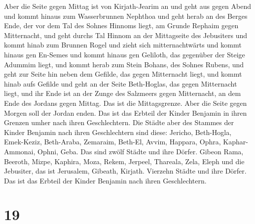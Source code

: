 Aber die Seite gegen Mittag ist von Kirjath-Jearim an und geht aus gegen
Abend und kommt hinaus zum Wasserbrunnen Nephthoa  und geht
herab an des Berges Ende, der vor dem Tal des Sohnes Hinnoms liegt, am
Grunde Rephaim gegen Mitternacht, und geht durchs Tal Hinnom an der
Mittagseite des Jebusiters und kommt hinab zum Brunnen Rogel
 und zieht sich mitternachtwärts und kommt hinaus gen
En-Semes und kommt hinaus gen Geliloth, das gegenüber der Steige Adummim
liegt, und kommt herab zum Stein Bohans, des Sohnes Rubens,
 und geht zur Seite hin neben dem Gefilde, das gegen
Mitternacht liegt, und kommt hinab aufs Gefilde  und geht
an der Seite Beth-Hoglas, das gegen Mitternacht liegt, und ihr Ende ist
an der Zunge des Salzmeers gegen Mitternacht, an dem Ende des Jordans
gegen Mittag. Das ist die Mittagsgrenze.  Aber die Seite
gegen Morgen soll der Jordan enden. Das ist das Erbteil der Kinder
Benjamin in ihren Grenzen umher nach ihren Geschlechtern. 
Die Städte aber des Stammes der Kinder Benjamin nach ihren Geschlechtern
sind diese: Jericho, Beth-Hogla, Emek-Keziz,  Beth-Araba,
Zemaraim, Beth-El,  Avvim, Happara, Ophra, 
Kaphar-Ammonai, Ophni, Geba. Das sind zwölf Städte und ihre Dörfer.
 Gibeon Rama, Beeroth,  Mizpe, Kaphira, Moza,
 Rekem, Jerpeel, Thareala,  Zela, Eleph und
die Jebusiter, das ist Jerusalem, Gibeath, Kirjath. Vierzehn Städte und
ihre Dörfer. Das ist das Erbteil der Kinder Benjamin nach ihren
Geschlechtern.

\hypertarget{section-18}{%
\section{19}\label{section-18}}

